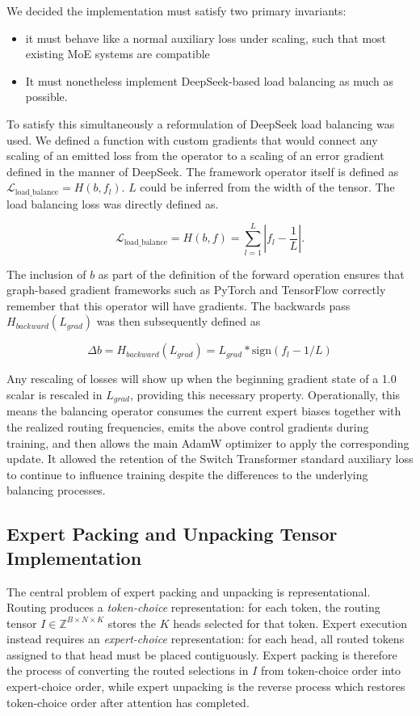 \documentclass[11pt]{article}
\begin{document}
We decided the implementation must satisfy two primary invariants:
\begin{itemize}
    \item it must behave like a normal auxiliary loss under scaling, such that most existing MoE systems are compatible
    \item It must nonetheless implement DeepSeek-based load balancing as much as possible.
\end{itemize}

To satisfy this simultaneously a reformulation of DeepSeek load balancing was used. We defined a function with custom gradients that would connect any scaling of an emitted loss from the operator to a scaling of an error gradient defined in the manner of DeepSeek. The framework operator itself is defined as $\mathcal{L}_{\mathrm{load\_balance}}=H(b, f_l)$. $L$ could be inferred from the width of the tensor. The load balancing loss was directly defined as.

\[
\mathcal{L}_{\mathrm{load\_balance}} = H(b, f) = \sum_{l=1}^{L} \left| f_l - \frac{1}{L} \right|.
\]

The inclusion of $b$ as part of the definition of the forward operation ensures that graph-based gradient frameworks such as PyTorch and TensorFlow correctly remember that this operator will have gradients. The backwards pass $ H_{backward}(L_{grad})$ was then subsequently defined as

\[
\Delta b = H_{backward}(L_{grad}) = L_{grad} * \mathrm{sign}(f_l -1/L)
\]

Any rescaling of losses will show up when the beginning gradient state of a 1.0 scalar is rescaled in $L_{grad}$, providing this necessary property. Operationally, this means the balancing operator consumes the current expert biases together with the realized routing frequencies, emits the above control gradients during training, and then allows the main AdamW optimizer to apply the corresponding update. It allowed the retention of the Switch Transformer standard auxiliary loss to continue to influence training despite the differences to the underlying balancing processes.

\subsection{Expert Packing and Unpacking Tensor Implementation}
\label{app:expert_packing}

The central problem of expert packing and unpacking is representational. Routing produces a \emph{token-choice} representation: for each token, the routing tensor $I \in \mathbb{Z}^{B \times N \times K}$ stores the $K$ heads selected for that token. Expert execution instead requires an \emph{expert-choice} representation: for each head, all routed tokens assigned to that head must be placed contiguously. Expert packing is therefore the process of converting the routed selections in $I$ from token-choice order into expert-choice order, while expert unpacking is the reverse process which restores token-choice order after attention has completed.
\end{document}
